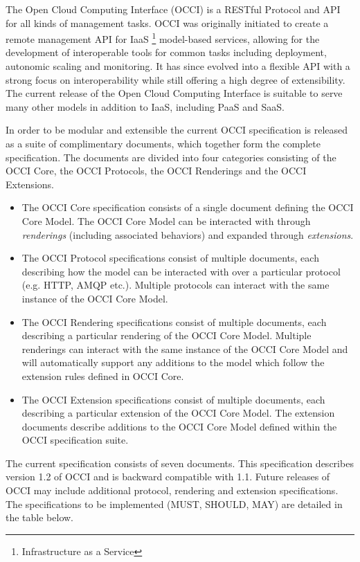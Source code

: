 The Open Cloud Computing Interface (OCCI) is a RESTful Protocol and
API for all kinds of management tasks. OCCI was originally initiated
to create a remote management API for IaaS%
\footnote{Infrastructure as a Service}
model-based services, allowing for the development of interoperable tools for
common tasks including deployment, autonomic scaling and monitoring.
%
It has since evolved into a flexible API with a strong focus on
interoperability while still offering a high degree of extensibility. The
current release of the Open Cloud Computing Interface is suitable to serve many
other models in addition to IaaS, including PaaS and SaaS.

In order to be modular and extensible the current OCCI specification is
released as a suite of complimentary documents, which together form the complete
specification.
%
The documents are divided into four categories consisting of the OCCI Core,
the OCCI Protocols, the OCCI Renderings and the OCCI Extensions.
%
\begin{itemize}
\item The OCCI Core specification consists of a single document defining the
 OCCI Core Model. The OCCI Core Model can be interacted with through {\em
 renderings} (including associated behaviors) and expanded through {\em extensions}.
\item The OCCI Protocol specifications consist of multiple documents, each
 describing how the model can be interacted with over a particular protocol (e.g. HTTP, AMQP etc.).
 Multiple protocols can interact with the same instance of the OCCI Core Model.
\item The OCCI Rendering specifications consist of multiple documents, each
 describing a particular rendering of the OCCI Core Model. Multiple renderings can
 interact with the same instance of the OCCI Core Model and will automatically support
 any additions to the model which follow the extension rules defined in OCCI
 Core.
\item The OCCI Extension specifications consist of multiple documents,
  each describing a particular extension of the OCCI Core Model. The
  extension documents describe additions to the OCCI Core Model
  defined within the OCCI specification suite.
\end{itemize}
%

The current specification consists of seven documents. This
specification describes version 1.2 of OCCI and is backward compatible with 1.1.
Future releases of OCCI
may include additional protocol, rendering and extension specifications. The specifications to be
implemented (MUST, SHOULD, MAY) are detailed in the table below.

